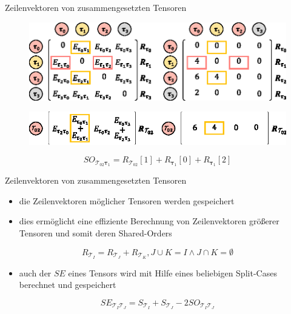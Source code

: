 \documentclass{beamer}
\newcommand{\Tau}{\bm{\mathcal{T}}}
\newcommand{\tauB}{\bm{\tau}}
\begin{document}
\begin{frame}{Zeilenvektoren von zusammengesetzten Tensoren}
	\begin{figure}
		\includegraphics[scale=.9]{figure_05_a_c}
	\end{figure} \pause
	\begin{figure}
		\includegraphics[scale=1.1]{figure_05_b_d}
	\end{figure} \pause
	\begin{equation*}
		SO_{\Tau_{02} \tauB_1} = R_{\Tau_{02}}[1] + R_{\tauB_1}[0] + R_{\tauB_1}[2]
	\end{equation*}
\end{frame}

\begin{frame}{Zeilenvektoren von zusammengesetzten Tensoren}
	\begin{itemize}
		\item die Zeilenvektoren möglicher Tensoren werden gespeichert
		\item dies ermöglicht eine effiziente Berechnung von Zeilenvektoren größerer Tensoren und somit deren Shared-Orders
	\end{itemize}
	\begin{equation*}
		R_{\Tau_I} = R_{\Tau_J} + R_{\Tau_K}, J \cup K = I \wedge J \cap K = \emptyset
	\end{equation*} \pause
	\begin{itemize}
		\item auch der $SE$ eines Tensors wird mit Hilfe eines beliebigen Split-Cases berechnet und gespeichert
	\end{itemize}
	\begin{equation*}
		SE_{\Tau_I \Tau_J} = S_{\Tau_{I}} + S_{\Tau_{J}} - 2SO_{\Tau_I \Tau_J}
	\end{equation*}
\end{frame}
\end{document}
